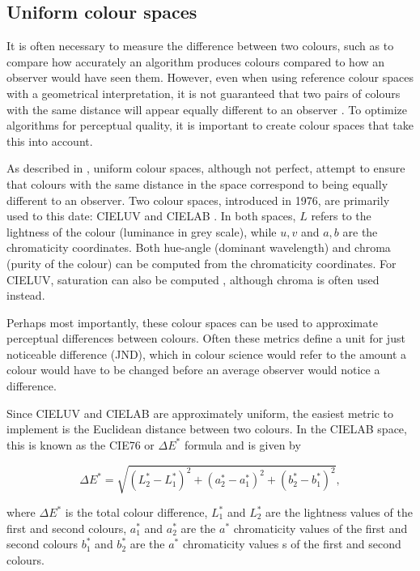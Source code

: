 \subsection{Uniform colour spaces}

It is often necessary to measure the difference between two colours, such as to compare how accurately an algorithm produces colours compared to how an observer would have seen them. However, even when using reference colour spaces with a geometrical interpretation, it is not guaranteed that two pairs of colours with the same distance will appear equally different to an observer \cite[48-49]{measuringcolour}. To optimize algorithms for perceptual quality, it is important to create colour spaces that take this into account.

As described in \cite[53-57]{measuringcolour}, uniform colour spaces, although not perfect, attempt to ensure that colours with the same distance in the space correspond to being equally different to an observer. Two colour spaces, introduced in 1976, are primarily used to this date: CIELUV and CIELAB \cite{cielab}. In both spaces, $L$ refers to the lightness of the colour (luminance in grey scale), while $u,v$ and $a,b$ are the chromaticity coordinates. Both hue-angle (dominant wavelength) and chroma (purity of the colour) can be computed from the chromaticity coordinates. For CIELUV, saturation can also be computed \cite[51]{measuringcolour}, although chroma is often used instead.

Perhaps most importantly, these colour spaces can be used to approximate perceptual differences between colours. Often these metrics define a unit for just noticeable difference (JND), which in colour science would refer to the amount a colour would have to be changed before an average observer would notice a difference.

Since CIELUV and CIELAB are approximately uniform, the easiest metric to implement is the Euclidean distance between two colours. In the CIELAB space, this is known as the CIE76 or $\Delta E^{*}$ formula and is given by

\begin{equation}
\label{eq:cie76}
\Delta E^* = \sqrt{(L_2^* - L_1^*)^2 + (a_2^* - a_1^*)^2 + (b_2^* - b_1^*)^2}
,
\end{equation}

where $\Delta E^*$ is the total colour difference, $L_1^*$ and $L_2^*$ are the lightness values of the first and second colours, 
$a_1^*$ and $a_2^*$ are the $a^*$ chromaticity values of the first and second colours
$b_1^*$  and $b_2^*$ are the $a^*$ chromaticity values s of the first and second colours.

